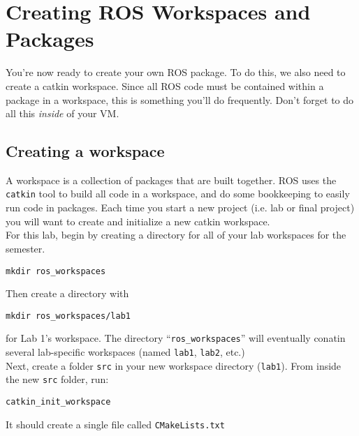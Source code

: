 \documentclass{article}
\begin{document}


\section{Creating ROS Workspaces and Packages}\label{sec:ws_and_pack}
You're now ready to create your own ROS package. To do this, we also need to create a catkin workspace. Since all ROS code must be contained within a package in a workspace, this is something you'll do frequently. Don't forget to do all this \textit{inside} of your VM.

\subsection{Creating a workspace}
A workspace is a collection of packages that are built together. ROS uses the \verb=catkin= tool to build all code in a workspace, and do some bookkeeping to easily run code in packages. Each time you start a new project (i.e. lab or final project) you will want to create and initialize a new catkin workspace.\\

For this lab, begin by creating a directory for all of your lab workspaces for the semester. 
\begin{Verbatim}[frame=single]
mkdir ros_workspaces
\end{Verbatim}
Then create a directory with 
\begin{Verbatim}[frame=single]
mkdir ros_workspaces/lab1
\end{Verbatim} 
for Lab 1's workspace. The directory ``\verb=ros_workspaces='' will eventually conatin several lab-specific workspaces (named \verb=lab1=, \verb=lab2=, etc.) \\

Next, create a folder \verb=src= in your new workspace directory (\verb=lab1=). From inside the new \verb=src= folder, run:
\begin{Verbatim}[frame=single]
catkin_init_workspace
\end{Verbatim}
It should create a single file called \verb=CMakeLists.txt=\\
\end{document}
